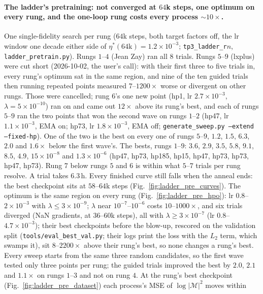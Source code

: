 \documentclass[11pt]{article}
\newcommand{\code}[1]{\texttt{#1}}
\begin{document}
\paragraph{The ladder's pretraining: not converged at $64$k steps, one optimum on every rung, and the one-loop rung costs every process $\sim10\times$.}
One single-fidelity search per rung ($64$k steps, both target factors off, the lr window one decade either
side of $\eta^\ast(64\text{k})=1.2\times10^{-3}$; \code{tp3\_ladder\_r}$n$, \code{ladder\_pretrain.py}). Rungs $1$--$4$
(Jean Zay) ran all $8$ trials. Rungs $5$--$9$ (lxplus) were cut short (2026-10-02, the user's call): with their first
three to five trials in, every rung's optimum sat in the same region, and nine of the ten guided trials then running
repeated points measured $7$--$1200\times$ worse or divergent on other rungs. Those were cancelled; rung $6$'s one new
point (hp1, lr $2.7\times10^{-3}$, $\lambda=5\times10^{-10}$) ran on and came out $12\times$ above its rung's best, and
each of rungs $5$--$9$ ran the two points that won the second wave on rungs $1$--$2$ (hp47, lr $1.1\times10^{-3}$, EMA
on; hp73, lr $1.8\times10^{-3}$, EMA off; \code{generate\_sweep.py --extend --fixed-hp}). One of the two is the best on
every one of rungs $5$--$9$, $1.2$, $1.5$, $6.3$, $2.0$ and $1.6\times$ below the first wave's. The bests, rungs
$1$--$9$: $3.6$, $2.9$, $3.5$, $5.8$, $9.1$, $8.5$, $4.9$, $15\times10^{-8}$ and $1.3\times10^{-6}$ (hp47, hp73, hp185,
hp15, hp47, hp73, hp73, hp47, hp73). Rung $7$ below rungs $5$ and $6$ is within what $5$--$7$ trials per rung resolve.
A trial takes $6.3$\,h.
Every finished curve still falls when the anneal ends: the best checkpoint sits at $58$--$64$k steps
(Fig.~\ref{fig:ladder_pre_curves}). The optimum is the same region on every rung (Fig.~\ref{fig:ladder_pre_hpo}): lr
$0.8$--$2\times10^{-3}$ with $\lambda\le3\times10^{-9}$; $\lambda$ near $10^{-7}$--$10^{-6}$ costs $10$--$1000\times$,
and six trials diverged (NaN gradients, at $36$--$60$k steps), all with $\lambda\ge3\times10^{-7}$ (lr $0.8$--$4.7\times10^{-3}$); their best checkpoints before the blow-up, rescored on the validation split (\code{tools/eval\_best\_val.py}; their logs print the loss with the $L_2$ term, which swamps it), sit $8$--$2200\times$ above their rung's best, so none changes a rung's best. Every sweep starts from the same three random candidates, so the first wave tested only three points
per rung; the guided trials improved the best by $2.0$, $2.1$ and $1.1\times$ on rungs $1$--$3$ and not on rung $4$. At
the rung's best checkpoint (Fig.~\ref{fig:ladder_pre_dataset}) each process's MSE of $\log|\mathcal M|^2$ moves within
\end{document}
